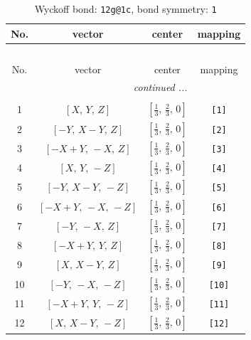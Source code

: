 \documentclass[fleqn,8pt]{jsarticle}
\begin{document}
\begin{longtable}{cccc}
\caption{Wyckoff bond: {\tt 12g@1c}, bond symmetry: {\tt 1}}
 \\
 \hline \hline
No. & vector & center & mapping \\ \hline \endfirsthead

\multicolumn{3}{l}{\tablename\ \thetable{}} \\
 \hline \hline
No. & vector & center & mapping \\ \hline \endhead

 \hline \hline
\multicolumn{3}{r}{\footnotesize\it continued ...} \\ \endfoot

 \hline \hline
\multicolumn{3}{r}{} \\ \endlastfoot

1 & $\left[ X,\, Y,\, Z \right]$ & $\left[ \frac{1}{3},\, \frac{2}{3},\, 0 \right]$ & {\tt [1]} \\ \hline
2 & $\left[ - Y,\, X - Y,\, Z \right]$ & $\left[ \frac{1}{3},\, \frac{2}{3},\, 0 \right]$ & {\tt [2]} \\ \hline
3 & $\left[ - X + Y,\, - X,\, Z \right]$ & $\left[ \frac{1}{3},\, \frac{2}{3},\, 0 \right]$ & {\tt [3]} \\ \hline
4 & $\left[ X,\, Y,\, - Z \right]$ & $\left[ \frac{1}{3},\, \frac{2}{3},\, 0 \right]$ & {\tt [4]} \\ \hline
5 & $\left[ - Y,\, X - Y,\, - Z \right]$ & $\left[ \frac{1}{3},\, \frac{2}{3},\, 0 \right]$ & {\tt [5]} \\ \hline
6 & $\left[ - X + Y,\, - X,\, - Z \right]$ & $\left[ \frac{1}{3},\, \frac{2}{3},\, 0 \right]$ & {\tt [6]} \\ \hline
7 & $\left[ - Y,\, - X,\, Z \right]$ & $\left[ \frac{1}{3},\, \frac{2}{3},\, 0 \right]$ & {\tt [7]} \\ \hline
8 & $\left[ - X + Y,\, Y,\, Z \right]$ & $\left[ \frac{1}{3},\, \frac{2}{3},\, 0 \right]$ & {\tt [8]} \\ \hline
9 & $\left[ X,\, X - Y,\, Z \right]$ & $\left[ \frac{1}{3},\, \frac{2}{3},\, 0 \right]$ & {\tt [9]} \\ \hline
10 & $\left[ - Y,\, - X,\, - Z \right]$ & $\left[ \frac{1}{3},\, \frac{2}{3},\, 0 \right]$ & {\tt [10]} \\ \hline
11 & $\left[ - X + Y,\, Y,\, - Z \right]$ & $\left[ \frac{1}{3},\, \frac{2}{3},\, 0 \right]$ & {\tt [11]} \\ \hline
12 & $\left[ X,\, X - Y,\, - Z \right]$ & $\left[ \frac{1}{3},\, \frac{2}{3},\, 0 \right]$ & {\tt [12]} \\
\end{longtable}
\end{document}
